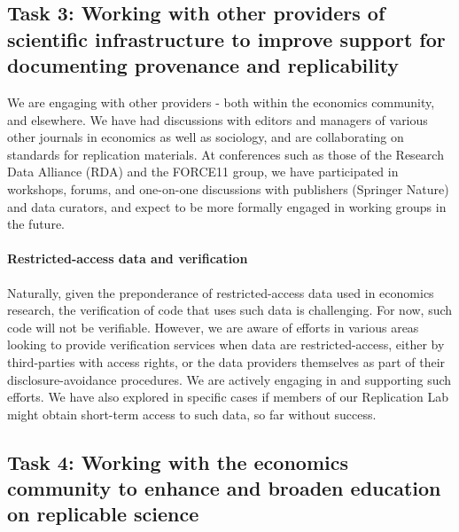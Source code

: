 \documentclass[PP]{AEA}
\begin{document}
\subsection{Task 3: Working with other providers of scientific infrastructure to improve support for documenting provenance and replicability}
We are engaging with other providers - both within the economics community, and elsewhere.
We have had discussions with editors and managers of various other journals in economics as well as sociology, and are collaborating on standards for replication materials. 
At conferences such as those of the Research Data Alliance (RDA) and the FORCE11 group, we have participated in workshops, forums, and one-on-one discussions with publishers (Springer Nature) and data curators, and expect to be more formally engaged in working groups in the future. 

\paragraph{Restricted-access data and verification} Naturally, given the preponderance of restricted-access data used in economics research, the verification of code that uses such data is challenging. For now, such code will not be verifiable. However, we are aware of efforts in various areas looking to provide verification services when data are restricted-access, either by third-parties with access rights, or the data providers themselves as part of their disclosure-avoidance procedures. We  are actively engaging in and supporting such efforts. We have also explored in specific cases if members of our Replication Lab might  obtain short-term access to such data, so far without success.



\subsection{Task 4: Working with the economics community to enhance and broaden education on replicable science}
\end{document}
